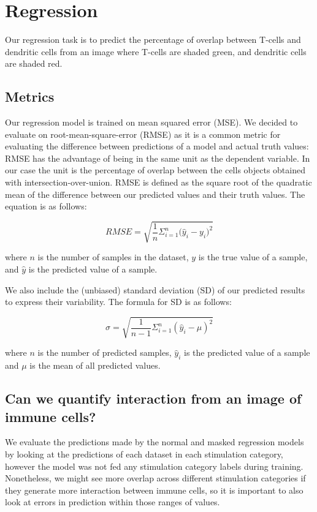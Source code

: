 \section{Regression}

Our regression task is to predict the percentage of overlap between T-cells and dendritic cells from an image where T-cells are shaded green, and dendritic cells are shaded red.

\subsection{Metrics}

Our regression model is trained on mean squared error (MSE). We decided to evaluate on root-mean-square-error (RMSE) as it is a common metric for evaluating the difference between predictions of a model and actual truth values: RMSE has the advantage of being in the same unit as the dependent variable. In our case the unit is the percentage of overlap between the cells objects obtained with intersection-over-union. RMSE is defined as the square root of the quadratic mean of the difference between our predicted values and their truth values. The equation is as follows:

\begin{equation}
    RMSE = \sqrt{\frac{1}{n}{\Sigma_{i=1}^{n}{\Big({\hat{y}_i-y_i})}^2}}
\end{equation}

where $n$ is the number of samples in the dataset, $y$ is the true value of a sample, and $\hat{y}$ is the predicted value of a sample. 

We also include the (unbiased) standard deviation (SD) of our predicted results to express their variability. The formula for SD is as follows:

\begin{equation}
    \sigma = \sqrt{\frac{1}{n-1}\Sigma_{i=1}^{n}{(\hat{y}_i - \mu)}^2}
\end{equation}

where $n$ is the number of predicted samples, $\hat{y}_i$ is the predicted value of a sample and $\mu$ is the mean of all predicted values. 

\subsection{Can we quantify interaction from an image of immune cells?}

We evaluate the predictions made by the normal and masked regression models by looking at the predictions of each dataset in each stimulation category, however the model was not fed any stimulation category labels during training. Nonetheless, we might see more overlap across different stimulation categories if they generate more interaction between immune cells, so it is important to also look at errors in prediction within those ranges of values.

